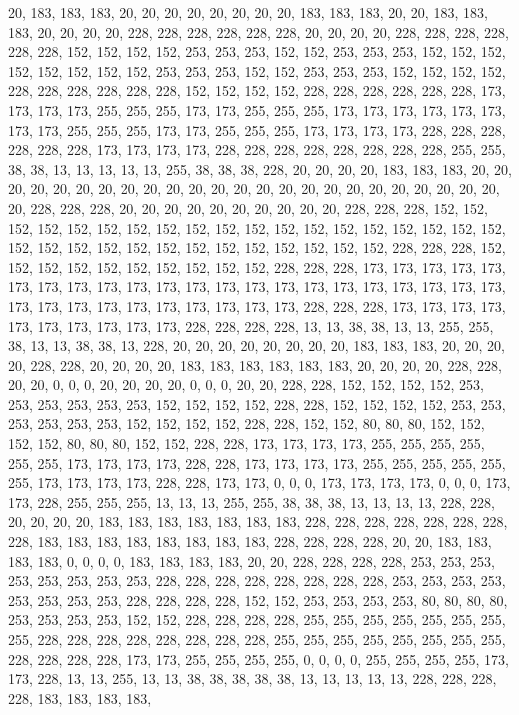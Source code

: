 {	20,  183, 183, 183, 20,  20,  20,  20,  20,  20,  20,  20,  183, 183, 183, 20,  20,  183, 183, 183, 20,  20,  20,  20,  228, 228, 228, 228, 228, 228, 20,  20,  20,  20,  228, 228, 228, 228, 228, 228, 152, 152, 152, 152, 253, 253, 253, 152, 152, 253, 253, 253, 152, 152, 152, 152, 152, 152, 152, 152, 253, 253, 253, 152, 152, 253, 253, 253, 152, 152, 152, 152, 228, 228, 228, 228, 228, 228, 152, 152, 152, 152, 228, 228, 228, 228, 228, 228, 173, 173, 173, 173, 255, 255, 255, 173, 173, 255, 255, 255, 173, 173, 173, 173, 173, 173, 173, 173, 255, 255, 255, 173, 173, 255, 255, 255, 173, 173, 173, 173, 228, 228, 228, 228, 228, 228, 173, 173, 173, 173, 228, 228, 228, 228, 228, 228, 228, 228, 255, 255, 38,  38,  13,  13,  13,  13,  13,  255, 38,  38,  38,  228, 20,  20,  20,  20,  183, 183, 183, 20,  
	20,  20,  20,  20,  20,  20,  20,  20,  20,  20,  20,  20,  20,  20,  20,  20,  20,  20,  20,  20,  20,  20,  20,  20,  228, 228, 228, 20,  20,  20,  20,  20,  20,  20,  20,  20,  20,  228, 228, 228, 152, 152, 152, 152, 152, 152, 152, 152, 152, 152, 152, 152, 152, 152, 152, 152, 152, 152, 152, 152, 152, 152, 152, 152, 152, 152, 152, 152, 152, 152, 152, 152, 228, 228, 228, 152, 152, 152, 152, 152, 152, 152, 152, 152, 152, 228, 228, 228, 173, 173, 173, 173, 173, 173, 173, 173, 173, 173, 173, 173, 173, 173, 173, 173, 173, 173, 173, 173, 173, 173, 173, 173, 173, 173, 173, 173, 173, 173, 173, 173, 228, 228, 228, 173, 173, 173, 173, 173, 173, 173, 173, 173, 173, 228, 228, 228, 228, 13,  13,  38,  38,  13,  13,  255, 255, 38,  13,  13,  38,  38,  13,  228, 20,  20,  20,  20,  20,  20,  20,  20,  
	183, 183, 183, 20,  20,  20,  20,  228, 228, 20,  20,  20,  20,  183, 183, 183, 183, 183, 183, 20,  20,  20,  20,  228, 228, 20,  20,  0,   0,   0,   20,  20,  20,  20,  0,   0,   0,   20,  20,  228, 228, 152, 152, 152, 152, 253, 253, 253, 253, 253, 253, 152, 152, 152, 152, 228, 228, 152, 152, 152, 152, 253, 253, 253, 253, 253, 253, 152, 152, 152, 152, 228, 228, 152, 152, 80,  80,  80,  152, 152, 152, 152, 80,  80,  80,  152, 152, 228, 228, 173, 173, 173, 173, 255, 255, 255, 255, 255, 255, 173, 173, 173, 173, 228, 228, 173, 173, 173, 173, 255, 255, 255, 255, 255, 255, 173, 173, 173, 173, 228, 228, 173, 173, 0,   0,   0,   173, 173, 173, 173, 0,   0,   0,   173, 173, 228, 255, 255, 255, 13,  13,  13,  255, 255, 38,  38,  38,  13,  13,  13,  13,  228, 228, 20,  20,  20,  20,  183, 183, 183, 
	183, 183, 183, 183, 228, 228, 228, 228, 228, 228, 228, 228, 183, 183, 183, 183, 183, 183, 183, 183, 228, 228, 228, 228, 20,  20,  183, 183, 183, 183, 0,   0,   0,   0,   183, 183, 183, 183, 20,  20,  228, 228, 228, 228, 253, 253, 253, 253, 253, 253, 253, 253, 228, 228, 228, 228, 228, 228, 228, 228, 253, 253, 253, 253, 253, 253, 253, 253, 228, 228, 228, 228, 152, 152, 253, 253, 253, 253, 80,  80,  80,  80,  253, 253, 253, 253, 152, 152, 228, 228, 228, 228, 255, 255, 255, 255, 255, 255, 255, 255, 228, 228, 228, 228, 228, 228, 228, 228, 255, 255, 255, 255, 255, 255, 255, 255, 228, 228, 228, 228, 173, 173, 255, 255, 255, 255, 0,   0,   0,   0,   255, 255, 255, 255, 173, 173, 228, 13,  13,  255, 13,  13,  38,  38,  38,  38,  38,  13,  13,  13,  13,  13,  228, 228, 228, 228, 183, 183, 183, 183, 
}
